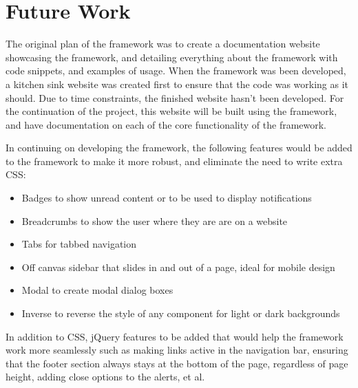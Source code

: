 \newpage
\chapter*{Future Work}



The original plan of the framework was to create a documentation website showcasing the framework, and detailing everything about the framework with code snippets, and examples of usage. When the framework was been developed, a kitchen sink website was created first to ensure that the code was working as it should. Due to time constraints, the finished website hasn't been developed. For the continuation of the project, this website will be built using the framework, and have documentation on each of the core functionality of the framework. 

In continuing on developing the framework, the following features would be added to the framework to make it more robust, and eliminate the need to write extra CSS:
\begin{itemize}
	\item Badges to show unread content or to be used to display notifications
	\item Breadcrumbs to show the user where they are are on a website
	\item Tabs for tabbed navigation
	\item Off canvas sidebar that slides in and out of a page, ideal for mobile design
	\item Modal to create modal dialog boxes
	\item Inverse to reverse the style of any component for light or dark backgrounds
\end{itemize}

In addition to CSS, jQuery features to be added that would help the framework work more seamlessly such as making links active in the navigation bar, ensuring that the footer section always stays at the bottom of the page, regardless of page height, adding close options to the alerts, et al. 

%
%

